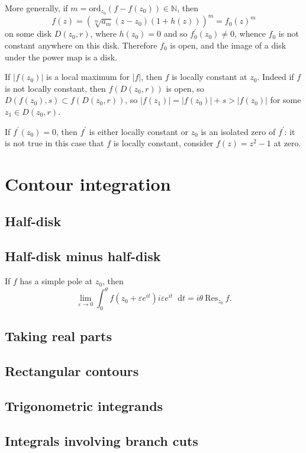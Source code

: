 \documentclass{article}
\newcommand\dif{\mathop{}\!\mathrm{d}}
\newcommand{\ord}{\mathrm{ord}}
\newcommand{\Res}{\mathrm{Res}}
\begin{document}
More generally, if $m = \ord_{z_0} (f - f(z_0)) \in \mathbb{N}$, then
$$
f(z) = (\sqrt[m]{a_m} (z - z_0)(1 + h(z)))^m = f_0(z)^m
$$
on some disk $D(z_0, r)$, where $h(z_0) = 0$ and so $f_0^\prime(z_0)
\neq 0$, whence $f_0$ is not constant anywhere on this disk. Therefore
$f_0$ is open, and the image of a disk under the power map is a disk.

If $|f(z_0)|$ is a local maximum for $|f|$, then $f$ is locally
constant at $z_0$. Indeed if $f$ is not locally constant, then
$f(D(z_0, r))$ is open, so $D(f(z_0), s) \subset f(D(z_0, r))$, so
$|f(z_1)| = |f(z_0)| + s > |f(z_0)|$ for some $z_1 \in D(z_0, r)$.

If $f^\prime(z_0) = 0$, then $f^\prime$ is either locally constant or
$z_0$ is an isolated zero of $f^\prime$: it is not true in this case
that $f$ is locally constant, consider $f(z) = z^2 - 1$ at zero.


\section{Contour integration}

\subsection{Half-disk}

\subsection{Half-disk minus half-disk}
If $f$ has a simple pole at $z_0$, then
$$
\lim_{\varepsilon \to 0}
  \int_0^\theta
    f(z_0 + \varepsilon e^{it})
    i \varepsilon e^{it}
    \dif t
= i \theta ~\Res_{z_0}~f.
$$

\subsection{Taking real parts}

\subsection{Rectangular contours}

\subsection{Trigonometric integrands}

\subsection{Integrals involving branch cuts}
\end{document}
